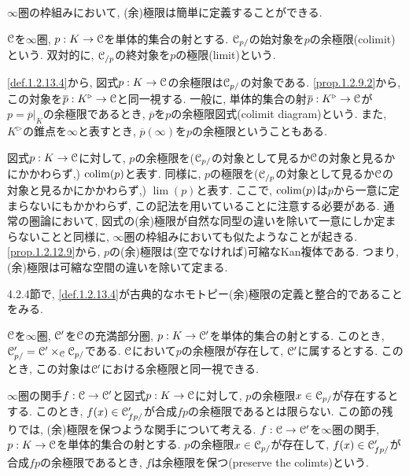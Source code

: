 \documentclass[uplatex, a4paper, 14Q, dvipdfmx]{jsreport}
\begin{document}
$\infty$圏の枠組みにおいて, (余)極限は簡単に定義することができる.

\begin{definition}[(余)極限] \label{def.1.2.13.4}
  $\mathcal{C}$を$\infty$圏, $p : K \to \mathcal{C}$を単体的集合の射とする. 
  $\mathcal{C}_{p/}$の始対象を$p$の余極限(colimit)という. 
  双対的に, $\mathcal{C}_{/p}$の終対象を$p$の極限(limit)という. 
\end{definition}

\begin{remark} \label{rem.1.2.13.5}
  \cref{def.1.2.13.4}から, 図式$p : K \to \mathcal{C}$の余極限は$\mathcal{C}_{p/}$の対象である. 
  \cref{prop.1.2.9.2}から, この対象を$\overline{p} : K^\triangleright \to \mathcal{C}$と同一視する. 
  一般に, 単体的集合の射$\overline{p} : K^\triangleright \to \mathcal{C}$が$p=\overline{p}|_{K}$の余極限であるとき, $\overline{p}$を$p$の余極限図式(colimit diagram)という. 
  また, $K^\triangleright$の錐点を$\infty$と表すとき, $\overline{p}(\infty)$を$p$の余極限ということもある. 
\end{remark}

図式$p : K \to \mathcal{C}$に対して, $p$の余極限を($\mathcal{C}_{p/}$の対象として見るか$\mathcal{C}$の対象と見るかにかかわらず,) $\mathrm{colim}(p)$と表す.
同様に, $p$の極限を($\mathcal{C}_{/p}$の対象として見るか$\mathcal{C}$の対象と見るかにかかわらず,) $\lim(p)$と表す.
ここで, $\mathrm{colim}(p)$は$p$から一意に定まらないにもかかわらず, この記法を用いていることに注意する必要がある.
通常の圏論において, 図式の(余)極限が自然な同型の違いを除いて一意にしか定まらないことと同様に, $\infty$圏の枠組みにおいても似たようなことが起きる. 
\cref{prop.1.2.12.9}から, $p$の(余)極限は(空でなければ)可縮なKan複体である. 
つまり, (余)極限は可縮な空間の違いを除いて定まる. 

\begin{remark} \label{rem.1.2.13.6}
  4.2.4節で, \cref{def.1.2.13.4}が古典的なホモトピー(余)極限の定義と整合的であることをみる. 
\end{remark}

\begin{remark} \label{rem.1.2.13.7}
  $\mathcal{C}$を$\infty$圏, $\mathcal{C}'$を$\mathcal{C}$の充満部分圏, $p : K \to \mathcal{C}'$を単体的集合の射とする. 
  このとき, $\mathcal{C}'_{p/} = \mathcal{C}' \times_{\mathcal{C}} \mathcal{C}_{p/}$である. 
  $\mathcal{C}$において$p$の余極限が存在して, $\mathcal{C}'$に属するとする. 
  このとき, この対象は$\mathcal{C}'$における余極限と同一視できる. 
\end{remark}

$\infty$圏の関手$f : \mathcal{C} \to \mathcal{C}'$と図式$p : K \to \mathcal{C}$に対して, $p$の余極限$x \in \mathcal{C}_{p/}$が存在するとする. 
このとき, $f(x) \in \mathcal{C}'_{fp/}$が合成$fp$の余極限であるとは限らない. 
この節の残りでは, (余)極限を保つような関手について考える. 
$f : \mathcal{C} \to \mathcal{C}'$を$\infty$圏の関手, $p : K \to \mathcal{C}$を単体的集合の射とする. 
$p$の余極限$x \in \mathcal{C}_{p/}$が存在して, $f(x) \in \mathcal{C}'_{fp/}$が合成$fp$の余極限であるとき, $f$は余極限を保つ(preserve the colimts)という. 
\end{document}
